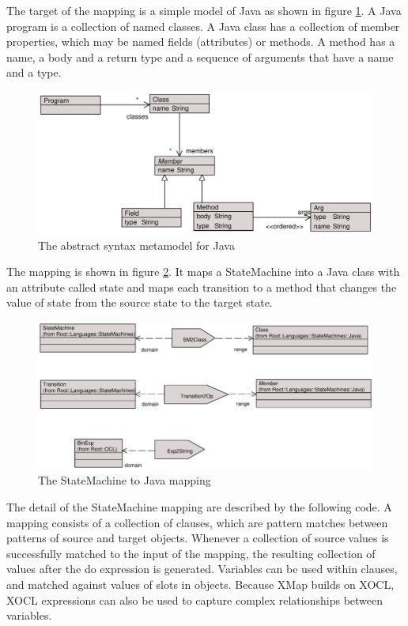 The target of the mapping is a simple model of Java as shown in
figure \ref{javamodel}. A Java program is a collection of named
classes. A Java class has a collection of member properties, which
may be named fields (attributes) or methods. A method has a name,
a body and  a return type and a sequence of arguments that have a
name and a type.

\begin{figure}[htb]
\begin{center}
\includegraphics[width=15cm]{Mappings/figures/javamodel.pdf}
\caption{The abstract syntax metamodel for Java} \label{javamodel}
\end{center}
\end{figure}

The mapping is shown in figure \ref{javamapping}. It maps a
StateMachine into a Java class with an attribute called state and
maps each transition to a method that changes the value of state
from the source state to the target state.

\begin{figure}[htb]
\begin{center}
\includegraphics[width=15cm]{Mappings/figures/javamapping.pdf}
\caption{The StateMachine to Java mapping} \label{javamapping}
\end{center}
\end{figure}

The detail of the StateMachine mapping are described by the
following code. A mapping consists of a collection of clauses,
which are pattern matches between patterns of source and target
objects. Whenever a collection of source values is successfully
matched to the input of the mapping, the resulting collection of
values after the do expression is generated. Variables can be used
within clauses, and matched against values of slots in objects.
Because XMap builds on XOCL, XOCL expressions can also be used to
capture complex relationships between variables.


